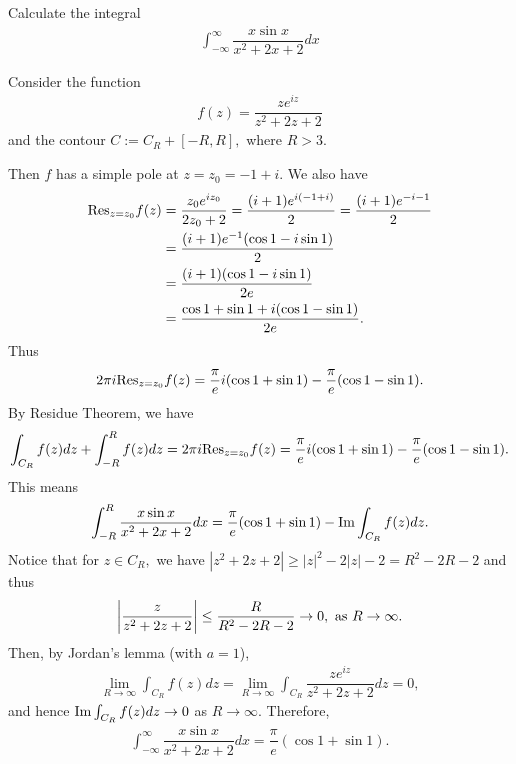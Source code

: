 \begin{problem}
Calculate the integral
\begin{align*}
    \int_{-\infty}^\infty \dfrac{x\sin x}{x^2+2x+2}dx
\end{align*}
\begin{solution}
Consider the function
\begin{align*}
    f(z)=\dfrac{ze^{iz}}{z^2+2z+2}
\end{align*}
and the contour $C:=C_R+[-R,R],$ where $R>3.$ 

Then $f$ has a simple pole at $z=z_0=-1+i$. We also have 
\begin{align*}
    {\rm Res}_{z=z_0}f(z)&=\dfrac{z_0e^{iz_0}}{2z_0+2}=\dfrac{(i+1)e^{i(-1+i)}}{2}=\dfrac{(i+1)e^{-i-1}}{2}\\
    &=\dfrac{(i+1)e^{-1}(\cos 1-i\sin 1)}{2}\\
    &=\dfrac{(i+1)(\cos 1-i\sin 1)}{2e}\\
    &=\dfrac{\cos 1+\sin 1+i(\cos 1-\sin 1)}{2e}.
\end{align*}
Thus 
\begin{align*}
    2\pi i{\rm Res}_{z=z_0}f(z)=\dfrac{\pi}{e}i(\cos 1+\sin 1)-\dfrac{\pi}{e}(\cos 1-\sin 1).
\end{align*}
By Residue Theorem, we have 
\begin{align*}
    \int_{C_R}f(z)dz+\int_{-R}^Rf(z)dz=2\pi i{\rm Res}_{z=z_0}f(z)=\dfrac{\pi}{e}i(\cos 1+\sin 1)-\dfrac{\pi}{e}(\cos 1-\sin 1).
\end{align*}
This means 
\begin{align*}
    \int_{-R}^R\dfrac{x\sin x}{x^2+2x+2}dx=\dfrac{\pi}{e}(\cos 1+\sin 1)-{\rm Im} \int_{C_R}f(z)dz.
\end{align*}
Notice that for $z\in C_R,$ we have $|z^2+2z+2|\ge |z|^2-2|z|-2=R^2-2R-2$ and thus 
\begin{align*}
    \left\lvert \dfrac{z}{z^2+2z+2}\right\rvert\le \dfrac{R}{R^2-2R-2}\rightarrow 0,\text{ as }R\rightarrow\infty.
\end{align*}
Then, by Jordan's lemma (with $a=1$),
\begin{align*}
    \lim_{R\rightarrow\infty}\int_{C_R}f(z)dz=\lim_{R\rightarrow\infty}\int_{C_R}\dfrac{ze^{iz}}{z^2+2z+2}dz=0,
\end{align*}
and hence ${\rm Im} \int_{C_R}f(z)dz\rightarrow 0$ as $R\rightarrow\infty$.
Therefore,
\begin{align*}
    \int_{-\infty}^\infty\dfrac{x\sin x}{x^2+2x+2}dx=\dfrac{\pi}{e}(\cos 1+\sin 1).
\end{align*}
\end{solution}
\end{problem}

